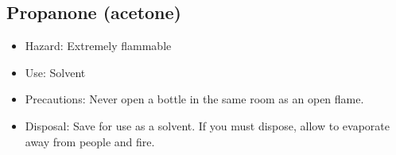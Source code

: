 \subsection{Propanone (acetone)}

\begin{itemize}

\item{Hazard: Extremely flammable}

\item{Use: Solvent}

\item{Precautions: Never open a bottle in the same room as an open flame.}

\item{Disposal: Save for use as a solvent. 
If you must dispose, allow to evaporate away from people and fire.}

\end{itemize}
